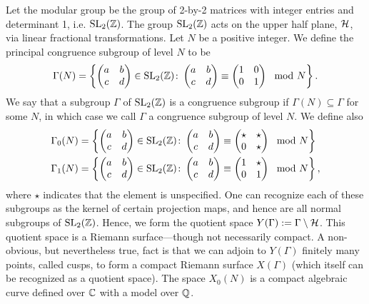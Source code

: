 Let the modular group be the group of 2-by-2 matrices with integer entries and determinant 1, i.e. $\operatorname{SL}_2(\mathbb{Z})$. The group $\operatorname{SL}_2(\mathbb{Z})$ acts on the upper half plane, $\mathcal{H}$, via linear fractional transformations. Let $N$ be a positive integer. We define the principal congruence subgroup of level $N$ to be
	\[
	\Gamma(N)= \left\{ \begin{pmatrix} a & b \\ c & d \end{pmatrix} \in \operatorname{SL}_2(\mathbb{Z}) \colon \begin{pmatrix} a & b \\ c & d \end{pmatrix} \equiv \begin{pmatrix} 1 & 0 \\ 0 & 1 \end{pmatrix} \mod N \right\}. 
	\]
We say that a subgroup $\Gamma$ of $\operatorname{SL}_2(\mathbb{Z})$ is a congruence subgroup if $\Gamma(N) \subseteq \Gamma$ for some $N$, in which case we call $\Gamma$ a congruence subgroup of level $N$. We define also
	\[
	\begin{aligned}
	\Gamma_0(N)&= \left\{ \begin{pmatrix} a & b \\ c & d \end{pmatrix} \in \operatorname{SL}_2(\mathbb{Z}) \colon \begin{pmatrix} a & b \\ c & d \end{pmatrix} \equiv \begin{pmatrix} \star & \star \\ 0 & \star \end{pmatrix} \mod N \right\} \\
	\Gamma_1(N)&= \left\{ \begin{pmatrix} a & b \\ c & d \end{pmatrix} \in \operatorname{SL}_2(\mathbb{Z}) \colon \begin{pmatrix} a & b \\ c & d \end{pmatrix} \equiv \begin{pmatrix} 1 & \star \\ 0 & 1 \end{pmatrix} \mod N \right\},
	\end{aligned}
	\]
where $\star$ indicates that the element is unspecified. One can recognize each of these subgroups as the kernel of certain projection maps, and hence are all normal subgroups of $\operatorname{SL}_2(\mathbb{Z})$. Hence, we form the quotient space $Y(\Gamma):= \Gamma\setminus \mathcal{H}$. This quotient space is a Riemann surface---though not necessarily compact. A non-obvious, but nevertheless true, fact is that we can adjoin to $Y(\Gamma)$ finitely many points, called cusps, to form a compact Riemann surface $X(\Gamma)$ (which itself can be recognized as a quotient space). The space $X_0(N)$ is a compact algebraic curve defined over $\mathbb{C}$ with a model over $\mathbb{Q}$. 



